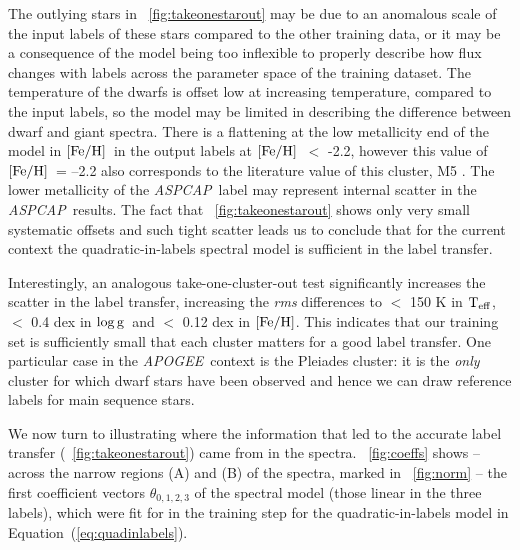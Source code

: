 \documentclass[12pt, preprint]{aastex}
\newcommand{\apogee}{\textsl{APOGEE}}
\newcommand{\aspcap}{\textsl{ASPCAP}}
\newcommand{\teff}{\mbox{$\rm T_{eff}$}}
\newcommand{\feh}{\mbox{$\rm [Fe/H]$}}
\newcommand{\logg}{\mbox{$\rm \log g$}}
\begin{document}
The outlying stars in \figurename~\ref{fig:takeonestarout} may be due to an anomalous scale of the input labels of these stars compared to the other training data, or it may be a consequence of the model being too inflexible to properly describe how flux changes with labels across the parameter space of the training dataset. 
The temperature of the dwarfs is offset low at increasing temperature, compared to the input labels, so the model may be limited in describing the difference between dwarf and giant spectra. 
There is a flattening at the low metallicity end of the model in \feh\ in the output labels at \feh\ $<$ -2.2, however this value of \feh\ = --2.2 also corresponds to the literature value of this cluster, M5 \citep{Meszaros2013}. 
The lower metallicity of the \aspcap\ label may represent internal scatter in the \aspcap\ results.
The fact that \figurename~\ref{fig:takeonestarout} shows only very small systematic offsets and such tight scatter leads us to conclude that for the
current context the quadratic-in-labels spectral model is sufficient in the label transfer. 

Interestingly, an analogous take-one-cluster-out test significantly increases the scatter in the label transfer, 
increasing the \textit{rms} differences to $<$ 150 K in \teff, $<$ 0.4 dex in \logg\ and $<$ 0.12 dex in \feh.
This indicates that our training set is sufficiently small that each cluster matters for a good label transfer. 
One particular case in the \apogee\ context is the Pleiades cluster: it is the \textit{only} cluster for which dwarf stars have been observed and hence we can draw reference labels for main sequence stars. 


 
We now turn to illustrating where the information that led to the accurate label transfer (\figurename~\ref{fig:takeonestarout}) came from in the spectra.
\figurename~\ref{fig:coeffs} shows -- across the narrow regions (A) and (B) of the spectra, marked in \figurename~\ref{fig:norm} -- the first coefficient vectors $\theta_{0,1,2,3}$ of the spectral model (those linear in the three labels), which were fit for in the training step for the quadratic-in-labels model in Equation~(\ref{eq:quadinlabels}). 
\end{document}
